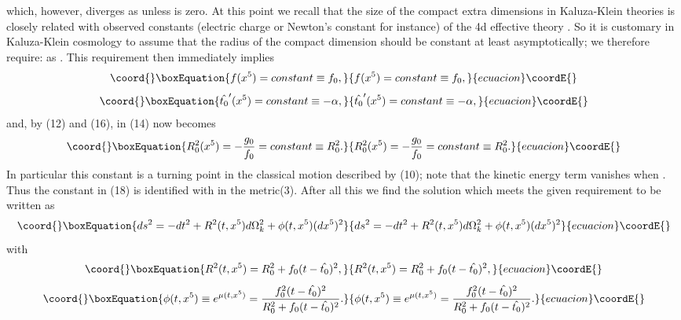 \documentclass[a4paper,12pt]{article}
\begin{document}
which, however, diverges as \coordHE{} unless
\coordHE{} is zero. At this point we recall that the size of the
compact extra dimensions in Kaluza-Klein theories is closely
related with observed constants (electric charge or Newton's
constant for instance) of the 4d effective theory \cite{gro}. So
it is customary in Kaluza-Klein cosmology to assume that the
radius of the compact dimension should be constant at least
asymptotically; we therefore require: \coordHE{} as \coordHE{}. This requirement then
immediately implies
\begin{equation}\coord{}\boxEquation{
f(x^5) = constant \equiv f_0  ,
}{
f(x^5) = constant \equiv f_0  ,
}{ecuacion}\coordE{}\end{equation}
\begin{equation}\coord{}\boxEquation{
\hat{t_0}^{\prime}(x^5) = constant \equiv -\alpha ,
}{
\hat{t_0}^{\prime}(x^5) = constant \equiv -\alpha ,
}{ecuacion}\coordE{}\end{equation}
and, by (12) and (16), \coordHE{} in (14) now becomes
\begin{equation}\coord{}\boxEquation{
R^2_0(x^5) = -\frac{g_0}{f_0} =constant \equiv R^2_0  .
}{
R^2_0(x^5) = -\frac{g_0}{f_0} =constant \equiv R^2_0  .
}{ecuacion}\coordE{}\end{equation}
In particular this constant \coordHE{} is a turning point in the
classical motion described by (10); note that the kinetic energy
term \coordHE{} vanishes when \coordHE{}. Thus the
constant \coordHE{} in (18) is identified with \coordHE{} in the metric(3).
After all this we find the solution which meets the given
requirement to be written as
\begin{equation}\coord{}\boxEquation{
ds^2=-dt^2 + R^2(t,x^5)d\Omega^2_k + \phi(t,x^5) (dx^5)^2
}{
ds^2=-dt^2 + R^2(t,x^5)d\Omega^2_k + \phi(t,x^5) (dx^5)^2
}{ecuacion}\coordE{}\end{equation}
with
\begin{equation}\coord{}\boxEquation{
R^2(t,x^5) =R^2_0 +f_0(t-\hat{t_0})^2  ,
}{
R^2(t,x^5) =R^2_0 +f_0(t-\hat{t_0})^2  ,
}{ecuacion}\coordE{}\end{equation}
\begin{equation}\coord{}\boxEquation{
 \phi(t,x^5)  \equiv e^{\mu(t,x^5)}
 =\frac{f^2_0(t-\hat{t_0})^2}{R^2_0 + f_0(t-\hat{t_0})^2}  .
 }{
 \phi(t,x^5)  \equiv e^{\mu(t,x^5)}
 =\frac{f^2_0(t-\hat{t_0})^2}{R^2_0 + f_0(t-\hat{t_0})^2}  .
 }{ecuacion}\coordE{}\end{equation}
\end{document}
